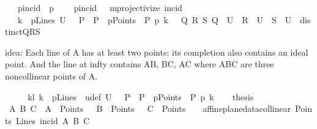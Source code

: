 \begin{isabellebody}
\isanewline
\ \ \ pincid\ {\isacharparenleft}{\kern0pt}\ {\isachardoublequoteopen}p{\isasymlhd}{\isachardoublequoteclose}\ {}{}{\isacharparenright}{\kern0pt}\isanewline
\ \ \ {\isacartoucheopen}pincid\ {\isacharequal}{\kern0pt}\ \ mprojectivize\ {\isacharparenleft}{\kern0pt}incid{\isacharparenright}{\kern0pt}{\isacartoucheclose}\isanewline
\ \ \ {\isachardoublequoteopen}{\isasymlbrakk}k\ {\isasymin}\ pLines{\isacharsemicolon}{\kern0pt}\ U\ {\isacharequal}{\kern0pt}\ {\isacharbraceleft}{\kern0pt}\ P\ {\isachardot}{\kern0pt}\ {\isacharparenleft}{\kern0pt}P\ {\isasymin}\ pPoints\ {\isasymand}\ P\ p{\isasymlhd}\ k{\isacharparenright}{\kern0pt}{\isacharbraceright}{\kern0pt}\ {\isasymrbrakk}\ {\isasymLongrightarrow}\ {\isasymexists}Q\ R\ S{\isachardot}{\kern0pt}\ Q\ {\isasymin}\ U\ {\isasymand}\ R\ {\isasymin}\ U\ {\isasymand}\ S\ {\isasymin}\ U\ {\isasymand}\ distinct{\isacharbrackleft}{\kern0pt}Q{\isacharcomma}{\kern0pt}R{\isacharcomma}{\kern0pt}S{\isacharbrackright}{\kern0pt}{\isachardoublequoteclose}%
\begin{isamarkuptext}%
idea: Each line of A has at least two points; its completion also contains an ideal point. And the line at infty contains AB, BC, AC where ABC are three 
noncollinear points of A.%
\end{isamarkuptext}\isamarkuptrue%
%
\isadelimproof
%
\endisadelimproof
%
\isatagproof
{}\isamarkupfalse%
\ {\isacharminus}{\kern0pt}\isanewline
\ \ \isamarkupfalse%
\ kl{\isacharcolon}{\kern0pt}\ {\isachardoublequoteopen}k\ {\isasymin}\ pLines{\isachardoublequoteclose}\ \ u{\isacharunderscore}{\kern0pt}def{\isacharcolon}{\kern0pt}\ {\isachardoublequoteopen}U\ {\isacharequal}{\kern0pt}\ {\isacharbraceleft}{\kern0pt}\ P\ {\isachardot}{\kern0pt}\ {\isacharparenleft}{\kern0pt}P\ {\isasymin}\ pPoints\ {\isasymand}\ {\isacharparenleft}{\kern0pt}P\ p{\isasymlhd}\ k{\isacharparenright}{\kern0pt}{\isacharparenright}{\kern0pt}{\isacharbraceright}{\kern0pt}{\isachardoublequoteclose}\isanewline
\ \ \isamarkupfalse%
\ {\isacharquery}{\kern0pt}thesis\ \isanewline
\ \ \isamarkupfalse%
\ {\isacharminus}{\kern0pt}\isanewline
\ \ \ \ \ \ \isamarkupfalse%
\ A\ B\ C\ \ {}{\isacharcolon}{\kern0pt}{\isachardoublequoteopen}A\ {\isasymin}\ Points{\isachardoublequoteclose}\ \ {}{\isacharcolon}{\kern0pt}\ {\isachardoublequoteopen}B\ {\isasymin}\ Points{\isachardoublequoteclose}\ \ {}{\isacharcolon}{\kern0pt}\ {\isachardoublequoteopen}C\ {\isasymin}\ Points{\isachardoublequoteclose}\ \ {}{\isacharcolon}{\kern0pt}\ {\isachardoublequoteopen}{\isasymnot}\ {\isacharparenleft}{\kern0pt}{\isacharparenleft}{\kern0pt}affine{\isacharunderscore}{\kern0pt}plane{\isacharunderscore}{\kern0pt}data{\isachardot}{\kern0pt}collinear\ Points\ Lines\ {\isacharparenleft}{\kern0pt}incid{\isacharparenright}{\kern0pt}{\isacharparenright}{\kern0pt}\ A\ B\ C{\isacharparenright}{\kern0pt}{\isachardoublequoteclose}\ \isamarkupfalse%

\end{isabellebody}

